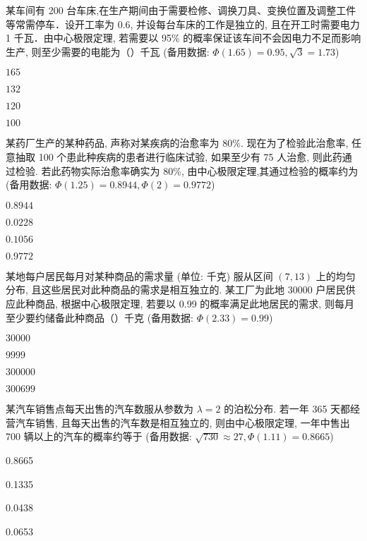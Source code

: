 \documentclass{exam-zh}
\begin{document}
\begin{question}
  某车间有 200 台车床,在生产期间由于需要检修、调换刀具、变换位置及调整工件等常需停车．设开工率为 0.6, 并设每台车床的工作是独立的, 且在开工时需要电力 1 千瓦．由中心极限定理, 若需要以 95\% 的概率保证该车间不会因电力不足而影响生产, 则至少需要的电能为（\quad ）千瓦
  (备用数据: $\Phi(1.65) = 0.95, \sqrt{3} = 1.73$)
  \paren[B]

  \begin{choices}
  \item $165$
  \item $132$
  \item $120$
  \item $100$
  \end{choices}
\end{question}

\begin{question}
  某药厂生产的某种药品, 声称对某疾病的治愈率为 80\%. 现在为了检验此治愈率, 任意抽取 100 个患此种疾病的患者进行临床试验, 如果至少有 75 人治愈, 则此药通过检验. 若此药物实际治愈率确实为 80\%, 由中心极限定理,其通过检验的概率约为
  (备用数据: $\Phi(1.25) = 0.8944, \Phi(2) = 0.9772$)
  \paren[A]
  
  \begin{choices}
  \item $0.8944$
  \item $0.0228$
  \item $0.1056$
  \item $0.9772$
  \end{choices}
\end{question}

\begin{question}
  某地每户居民每月对某种商品的需求量 (单位: 千克) 服从区间 $(7, 13)$ 上的均匀分布, 且这些居民对此种商品的需求是相互独立的. 某工厂为此地 30000 户居民供应此种商品, 根据中心极限定理, 若要以 0.99 的概率满足此地居民的需求, 则每月至少要约储备此种商品（\quad ）千克 (备用数据: $\Phi(2.33) = 0.99$)
  \paren[D]
  
  \begin{choices}
  \item $30000$
  \item $9999$
  \item $300000$
  \item $300699$
  \end{choices}
\end{question}

\begin{question}
  某汽车销售点每天出售的汽车数服从参数为 $\lambda = 2$ 的泊松分布. 若一年 365 天都经营汽车销售, 且每天出售的汽车数是相互独立的, 则由中心极限定理, 一年中售出 700 辆以上的汽车的概率约等于
  (备用数据: $\sqrt{730} \approx 27, \Phi(1.11) = 0.8665$)
  \paren[A]

  \begin{choices}
  \item 0.8665
  \item 0.1335
  \item 0.0438
  \item 0.0653
  \end{choices}
\end{question}
\end{document}
